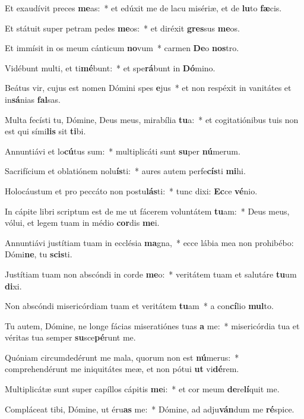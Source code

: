 \item Et exaudívit preces \textbf{me}as:~* et edúxit me de lacu misériæ, et de \textbf{lu}to \textbf{fæ}cis.
\item Et státuit super petram pedes \textbf{me}os:~* et diréxit \textbf{gres}sus \textbf{me}os.
\item Et immísit in os meum cánticum \textbf{no}vum~* carmen \textbf{De}o \textbf{nos}tro.
\item Vidébunt multi, et ti\textbf{mé}bunt:~* et spe\textbf{rá}bunt in \textbf{Dó}mino.
\item Beátus vir, cujus est nomen Dómini spes \textbf{e}jus~* et non respéxit in vanitátes et in\textbf{sá}nias \textbf{fal}sas.
\item Multa fecísti tu, Dómine, Deus meus, mirabília \textbf{tu}a:~* et cogitatiónibus tuis non est qui sími\textbf{lis} sit \textbf{ti}bi.
\item Annuntiávi et lo\textbf{cú}tus sum:~* multiplicáti sunt \textbf{su}per \textbf{nú}merum.
\item Sacrifícium et oblatiónem nolu\textbf{ís}ti:~* aures autem perfe\textbf{cís}ti \textbf{mi}hi.
\item Holocáustum et pro peccáto non postu\textbf{lás}ti:~* tunc dixi: \textbf{Ec}ce \textbf{vé}nio.
\item In cápite libri scriptum est de me ut fácerem voluntátem \textbf{tu}am:~* Deus meus, vólui, et legem tuam in médio \textbf{cor}dis \textbf{me}i.
\item Annuntiávi justítiam tuam in ecclésia \textbf{ma}gna,~* ecce lábia mea non prohibébo: Dómi\textbf{ne}, tu \textbf{scis}ti.
\item Justítiam tuam non abscóndi in corde \textbf{me}o:~* veritátem tuam et salutáre \textbf{tu}um \textbf{di}xi.
\item Non abscóndi misericórdiam tuam et veritátem \textbf{tu}am~* a con\textbf{cí}lio \textbf{mul}to.
\item Tu autem, Dómine, ne longe fácias miseratiónes tuas \textbf{a} me:~* misericórdia tua et véritas tua semper \textbf{su}sce\textbf{pé}runt me.
\item Quóniam circumdedérunt me mala, quorum non est \textbf{nú}merus:~* comprehendérunt me iniquitátes meæ, et non pótui \textbf{ut} vi\textbf{dé}rem.
\item Multiplicátæ sunt super capíllos cápitis \textbf{me}i:~* et cor meum \textbf{de}re\textbf{lí}quit me.
\item Compláceat tibi, Dómine, ut éru\textbf{as} me:~* Dómine, ad adju\textbf{ván}dum me \textbf{ré}spice.
